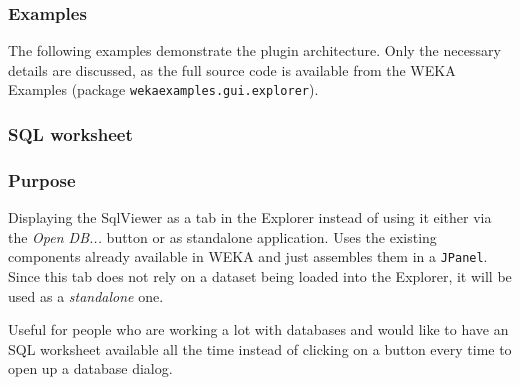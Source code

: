 \subsubsection{Examples}
The following examples demonstrate the plugin architecture. Only the
necessary details are discussed, as the full source code is available from the
WEKA Examples \cite{wekaexamples} (package \texttt{wekaexamples.gui.explorer}).

\subsubsection*{SQL worksheet}
\subsubsection*{Purpose}
Displaying the SqlViewer as a tab in the Explorer instead of using it either via
the \textit{Open DB...} button or as standalone application. Uses the existing
components already available in WEKA and just assembles them in a
\texttt{JPanel}. Since this tab does not rely on a dataset being loaded into the
Explorer, it will be used as a \textit{standalone} one.

Useful for people who are working a lot with databases and would like to have an
SQL worksheet available all the time instead of clicking on a button every time
to open up a database dialog.

